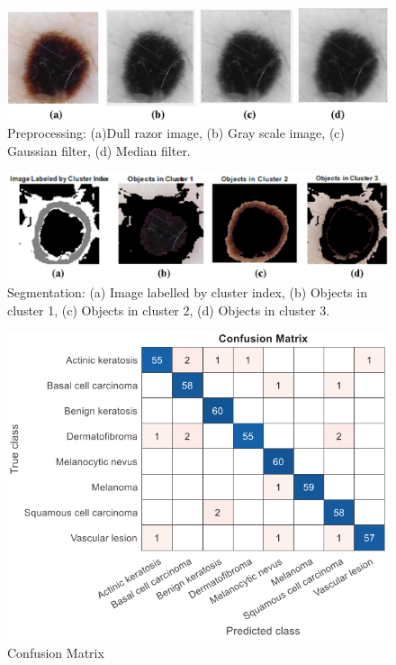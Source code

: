 \begin{figure}[htbp]
\begin{center}
\includegraphics[width=15cm]{./chapter-03-state-of-the-art/preprocessing.png}
\end{center}
\caption{Preprocessing: (a)Dull razor image, (b) Gray scale image, (c) Gaussian filter, (d) Median filter.}
\label{fig:Preprocessing}
\end{figure}




\begin{figure}[htbp]
\begin{center}
\includegraphics[width=15cm]{./chapter-03-state-of-the-art/segmentation.png}
\end{center}
\caption{Segmentation: (a) Image labelled by cluster index, (b) Objects in cluster 1, (c) Objects in cluster 2, (d) Objects in cluster 3.}
\label{fig:segmentation}
\end{figure}


\begin{figure}[htbp]
\begin{center}
\includegraphics[width=15cm]{./chapter-03-state-of-the-art/confusion-matrix.png}
\end{center}
\caption{Confusion Matrix}
\label{fig:confusion-matrix}
\end{figure}



